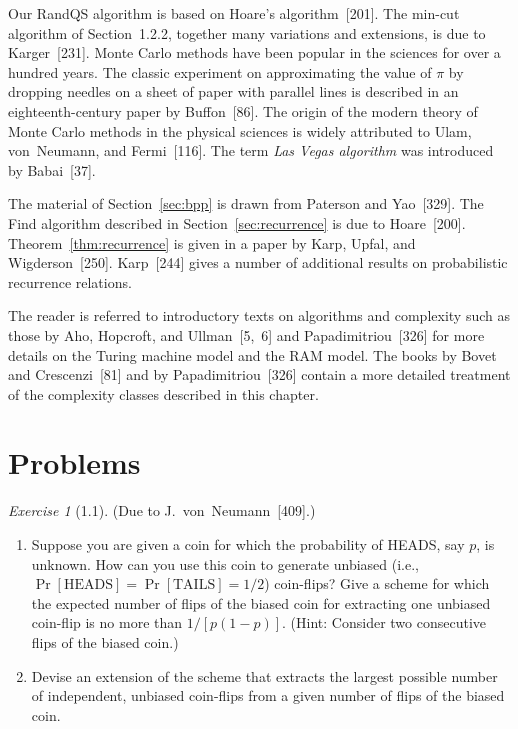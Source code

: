 \documentclass[twoside,12pt]{book}
\theoremstyle{plain}
\theoremstyle{definition}
\theoremstyle{remark}
\newtheorem{exercise}[theorem]{Exercise}
\begin{document}
Our RandQS algorithm is based on Hoare's algorithm~[201].  The min-cut
algorithm of Section~1.2.2, together many variations and
extensions, is due to Karger~[231].  Monte Carlo methods have been popular in
the sciences for over a hundred years.  The classic experiment on
approximating the value of $\pi$ by dropping needles on a sheet of paper with
parallel lines is described in an eighteenth-century paper by
Buffon~[86].  The origin of the modern theory of Monte Carlo methods in the
physical sciences is widely attributed to Ulam, von~Neumann, and
Fermi~[116].  The term \emph{Las Vegas algorithm} was introduced by
Babai~[37].

The material of Section~\ref{sec:bpp} is drawn from Paterson and
Yao~[329].  The Find algorithm described in Section~\ref{sec:recurrence} is
due to Hoare~[200].  Theorem~\ref{thm:recurrence} is given in a paper by
Karp, Upfal, and Wigderson~[250].  Karp~[244] gives a number of additional
results on probabilistic recurrence relations.

The reader is referred to introductory texts on algorithms and complexity
such as those by Aho, Hopcroft, and Ullman~[5,~6] and
Papadimitriou~[326] for more details on the Turing machine model and the
RAM model.  The books by Bovet and Crescenzi~[81] and by
Papadimitriou~[326] contain a more detailed treatment of the complexity
classes described in this chapter.

\section*{Problems}

\begin{exercise}[1.1]
(Due to J.~von~Neumann~[409].)
\begin{enumerate}[label=(\alph*)]
\item Suppose you are given a coin for which the probability of HEADS, say
  $p$, is unknown.  How can you use this coin to generate unbiased (i.e.,
  $\Pr[\text{HEADS}]=\Pr[\text{TAILS}]=1/2$) coin-flips?  Give a scheme for
  which the expected number of flips of the biased coin for extracting one
  unbiased coin-flip is no more than $1/[p(1-p)]$.  (Hint: Consider two
  consecutive flips of the biased coin.)
\item Devise an extension of the scheme that extracts the largest possible
  number of independent, unbiased coin-flips from a given number of flips of
  the biased coin.
\end{enumerate}
\end{exercise}
\end{document}
